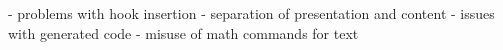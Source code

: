 \documentclass{article}
\begin{document}
- problems with hook insertion
  - separation of presentation and content
- issues with generated code
  - misuse of math commands for text 
\end{document}
